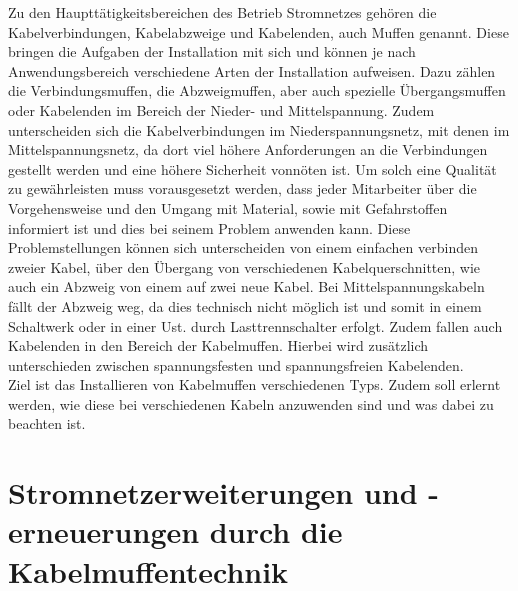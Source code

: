 Zu den Haupttätigkeitsbereichen des Betrieb Stromnetzes gehören die Kabelverbindungen, Kabelabzweige und Kabelenden, auch Muffen genannt. Diese bringen die 
Aufgaben der Installation mit sich und können je nach Anwendungsbereich verschiedene Arten der Installation aufweisen. Dazu zählen \zB die Verbindungsmuffen, 
die Abzweigmuffen, aber auch spezielle Übergangsmuffen oder Kabelenden im Bereich der Nieder- und Mittelspannung. Zudem unterscheiden sich die 
Kabelverbindungen im Niederspannungsnetz, mit denen im Mittelspannungsnetz, da dort viel höhere Anforderungen an die Verbindungen gestellt werden und eine 
höhere Sicherheit vonnöten ist. Um solch eine Qualität zu gewährleisten muss vorausgesetzt werden, dass jeder Mitarbeiter über die Vorgehensweise und den 
Umgang mit Material, sowie mit Gefahrstoffen informiert ist und dies bei seinem Problem anwenden kann. Diese Problemstellungen können sich unterscheiden von 
einem einfachen verbinden zweier Kabel, über den Übergang von verschiedenen Kabelquerschnitten, wie auch ein Abzweig von einem auf zwei neue Kabel. Bei 
Mittelspannungskabeln fällt der Abzweig weg, da dies technisch nicht möglich ist und somit in einem Schaltwerk oder in einer Ust. durch Lasttrennschalter 
erfolgt. Zudem fallen auch Kabelenden in den Bereich der Kabelmuffen. Hierbei wird zusätzlich unterschieden zwischen spannungsfesten und spannungsfreien 
Kabelenden. 
\\
Ziel ist das Installieren von Kabelmuffen verschiedenen Typs. Zudem soll erlernt werden, wie diese bei verschiedenen Kabeln anzuwenden sind und was dabei 
zu beachten ist.
\clearpage

\section{Stromnetzerweiterungen und -erneuerungen durch die Kabelmuffentechnik}

